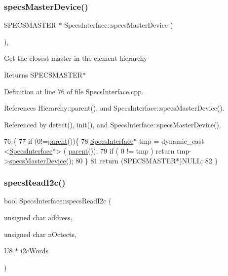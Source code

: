 \subsubsection{\texorpdfstring{specs\+Master\+Device()}{specsMasterDevice()}}
{\footnotesize\ttfamily S\+P\+E\+C\+S\+M\+A\+S\+T\+ER $\ast$ Specs\+Interface\+::specs\+Master\+Device (\begin{DoxyParamCaption}{ }\end{DoxyParamCaption})\hspace{0.3cm}{\ttfamily [virtual]}, {\ttfamily [inherited]}}

Get the closest master in the element hierarchy \begin{DoxyReturn}{Returns}
S\+P\+E\+C\+S\+M\+A\+S\+T\+E\+R$\ast$ 
\end{DoxyReturn}


Definition at line 76 of file Specs\+Interface.\+cpp.



References Hierarchy\+::parent(), and Specs\+Interface\+::specs\+Master\+Device().



Referenced by detect(), init(), and Specs\+Interface\+::specs\+Master\+Device().


\begin{DoxyCode}
76                                               \{
77     \textcolor{keywordflow}{if} (0!=\hyperlink{classHierarchy_a1c7bec8257e717f9c1465e06ebf845fc}{parent}())\{
78     \hyperlink{classSpecsInterface}{SpecsInterface}* tmp = dynamic\_cast <\hyperlink{classSpecsInterface}{SpecsInterface}*> (
      \hyperlink{classHierarchy_a1c7bec8257e717f9c1465e06ebf845fc}{parent}());
79     \textcolor{keywordflow}{if} ( 0 != tmp ) \textcolor{keywordflow}{return} tmp->\hyperlink{classSpecsInterface_aa8aeaa74acf2c913905ea996d153a6ef}{specsMasterDevice}();
80     \}
81   \textcolor{keywordflow}{return} (SPECSMASTER*)NULL;
82 \}
\end{DoxyCode}
\mbox{\label{classSpecsInterface_a7e9a0fe69a998e624ca2d7339b61bcb5}} 
\subsubsection{\texorpdfstring{specs\+Read\+I2c()}{specsReadI2c()}\hspace{0.1cm}{\footnotesize\ttfamily [1/4]}}
{\footnotesize\ttfamily bool Specs\+Interface\+::specs\+Read\+I2c (\begin{DoxyParamCaption}\item[{unsigned char}]{address,  }\item[{unsigned char}]{n\+Octects,  }\item[{\hyperlink{ICECALv3_8h_a3cb25ca6f51f003950f9625ff05536fc}{U8} $\ast$}]{i2c\+Words }\end{DoxyParamCaption})\hspace{0.3cm}{\ttfamily [inherited]}}

